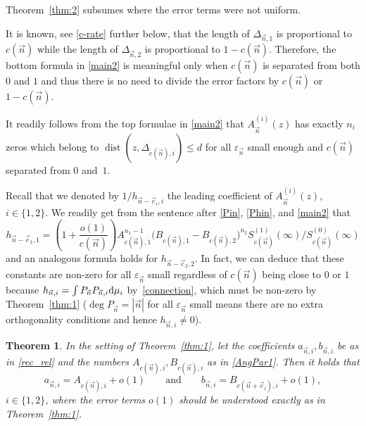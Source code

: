 \documentclass[10pt,a4paper]{amsart}
\numberwithin{equation}{section}
\newtheorem{Theorem}{Theorem}[section]
\newcommand{\dist}{\operatorname{dist}}
\newcommand{\n}{{\vec n}}
\begin{document}
Theorem~\ref{thm:2} subsumes \cite[Theorem~3.3]{ApDenYa21} where the error terms were not uniform.

\begin{Remark}
It is known, see \eqref{c-rate} further below, that the length of $ \Delta_{\n,1} $ is proportional to~$ c(\n) $ while the length of $ \Delta_{\n,2} $ is proportional to $ 1 - c(\n) $. Therefore, the bottom formula in \eqref{main2} is meaningful only when $ c(\n) $ is separated from both $ 0 $ and $ 1 $ and thus there is no need to divide the error factors by $ c(\n) $ or $ 1- c(\n) $.
\end{Remark}

\begin{Remark}
It readily follows from the top formulae in \eqref{main2} that $ A_\n^{(i)}(z) $ has exactly $ n_i $ zeros which belong to $ \dist(z,\Delta_{c(\n),i})\leq d $ for all $ \varepsilon_\n $ small enough and $ c(\n) $ separated from $ 0 $ and~$ 1 $.
\end{Remark}

\begin{Remark}
Recall that we denoted by $ 1/h_{\n-\vec e_i,i} $ the leading coefficient of $ A_\n^{(i)}(z) $, $ i\in\{1,2\} $. We readily get from the sentence after \eqref{Pin}, \eqref{Phin}, and \eqref{main2} that
\[
h_{\n-\vec e_1,1} = \left(1+\frac{o(1)}{c(\n)}\right)A_{c(\n),1}^{n_1-1} \bigl(B_{c(\n),1} - B_{c(\n),2}\bigr)^{n_2} S_{c(\n)}^{(1)}(\infty)/S_{c(\n)}^{(0)}(\infty)
\]
and an analogous formula holds for $ h_{\n-\vec e_2,2} $. In fact, we can deduce that these constants are non-zero for all $ \varepsilon_\n $ small regardless of $ c(\n) $ being close to $ 0 $ or $ 1 $ because $ h_{\n,i}=\int P_\n P_{\n,i}{\rm d}\mu_i $ by~\eqref{connection}, which must be non-zero by Theorem~\ref{thm:1} ($ \deg P_\n = |\n| $ for all $ \varepsilon_\n $ small means there are no extra orthogonality conditions and hence $ h_{\n,i}\neq 0 $).
\end{Remark}


\begin{Theorem}
\label{thm:3}
In the setting of Theorem~{\rm\ref{thm:1}}, let the coefficients $ a_{\n,i},b_{\n,i} $ be as in \eqref{rec_rel} and the numbers $ A_{c(\n),i},B_{c(\n),i} $ as in \eqref{AngPar1}. Then it holds that
\begin{equation}
\label{main3}
a_{\n,i} = A_{c(\n),i} + o(1) \qquad \text{and}\qquad  b_{\n,i} = B_{c(\n+\vec e_i),i} + o(1),
\end{equation}
$ i\in\{1,2\} $, where the error terms $ o(1) $ should be understood exactly as in Theorem~{\rm\ref{thm:1}}.
\end{Theorem}
\end{document}
